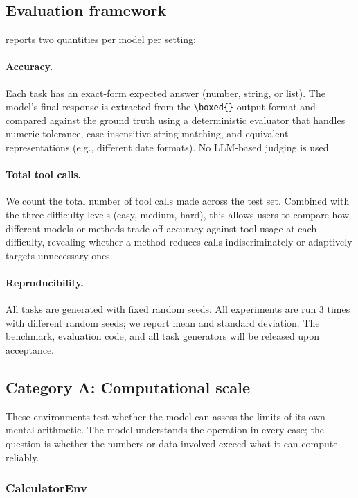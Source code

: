 \subsection{Evaluation framework}

\benchmark{} reports two quantities per model per setting:

\paragraph{Accuracy.}
Each task has an exact-form expected answer (number, string, or list). The model's final response is extracted from the \texttt{\textbackslash boxed\{\}} output format and compared against the ground truth using a deterministic evaluator that handles numeric tolerance, case-insensitive string matching, and equivalent representations (e.g., different date formats). No LLM-based judging is used.

\paragraph{Total tool calls.}
We count the total number of tool calls made across the test set. Combined with the three difficulty levels (easy, medium, hard), this allows users to compare how different models or methods trade off accuracy against tool usage at each difficulty, revealing whether a method reduces calls indiscriminately or adaptively targets unnecessary ones.

\paragraph{Reproducibility.}
All tasks are generated with fixed random seeds. All experiments are run 3 times with different random seeds; we report mean and standard deviation. The benchmark, evaluation code, and all task generators will be released upon acceptance.

\subsection{Category A: Computational scale}

These environments test whether the model can assess the limits of its own mental arithmetic. The model understands the operation in every case; the question is whether the numbers or data involved exceed what it can compute reliably.

\subsubsection{CalculatorEnv}

